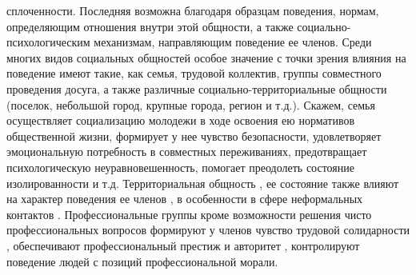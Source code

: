 \documentclass[12pt]{article}
\begin{document}
сплоченности.  Последняя  возможна  благодаря  образцам  поведения,  нормам,  определяющим  отношения
внутри  этой  общности,  а  также  социально-психологическим  механизмам,  направляющим  поведение  ее
членов.
Среди многих видов социальных общностей особое значение с точки зрения влияния на поведение имеют
такие, как семья, трудовой коллектив, группы совместного проведения досуга, а также различные социально-территориальные общности (поселок, небольшой город, крупные города, регион и т.д.). Скажем, семья
осуществляет социализацию молодежи в ходе освоения ею нормативов общественной жизни, формирует у нее
чувство  безопасности,  удовлетворяет  эмоциональную  потребность  в  совместных  переживаниях,
предотвращает психологическую неуравновешенность, помогает преодолеть состояние изолированности и т.д.
Территориальная общность , ее состояние также влияют на характер поведения ее членов , в особенности в
сфере  неформальных  контактов  .  Профессиональные  группы  кроме  возможности  решения  чисто
профессиональных  вопросов  формируют  у  членов  чувство  трудовой  солидарности  ,  обеспечивают
профессиональный  престиж  и  авторитет  ,  контролируют  поведение  людей  с  позиций  профессиональной
морали. 

\newpage
\end{document}
